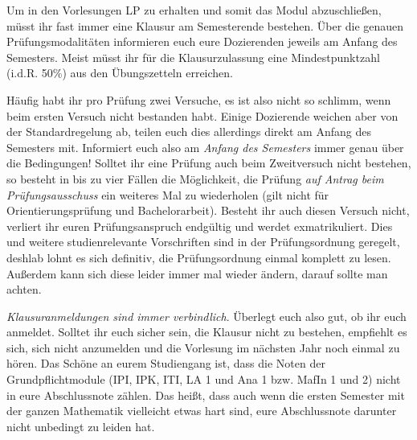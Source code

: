 Um in den Vorlesungen \gls{LP} zu erhalten und somit das Modul abzuschließen, müsst ihr fast immer eine Klausur am Semesterende bestehen. Über die genauen Prüfungsmodalitäten informieren euch eure Dozierenden jeweils am Anfang des Semesters. Meist müsst ihr für die Klausurzulassung eine Mindestpunktzahl (i.d.R. 50\%) aus den Übungszetteln erreichen.

Häufig habt ihr pro Prüfung zwei Versuche, es ist also nicht so schlimm, wenn beim ersten Versuch nicht bestanden habt. Einige Dozierende weichen aber von der Standardregelung ab, teilen euch dies allerdings direkt am Anfang des Semesters mit. Informiert euch also am \emph{Anfang des Semesters} immer genau über die Bedingungen! Solltet ihr eine Prüfung auch beim Zweitversuch nicht bestehen, so besteht in bis zu vier Fällen die Möglichkeit, die Prüfung \emph{auf Antrag beim Prüfungsausschuss} ein weiteres Mal zu wiederholen (gilt nicht für Orientierungsprüfung und Bachelorarbeit). Besteht ihr auch diesen Versuch nicht, verliert ihr euren Prüfungsanspruch endgültig und werdet exmatrikuliert. Dies und weitere studienrelevante Vorschriften sind in der Prüfungsordnung geregelt, deshlab lohnt es sich definitiv, die Prüfungsordnung einmal komplett zu lesen. Außerdem kann sich diese leider immer mal wieder ändern, darauf sollte man achten.

\emph{Klausuranmeldungen sind immer verbindlich}. Überlegt euch also gut, ob ihr euch anmeldet. Solltet ihr euch sicher sein, die Klausur nicht zu bestehen, empfiehlt es sich, sich nicht anzumelden und die Vorlesung im nächsten Jahr noch einmal zu hören. Das Schöne an eurem Studiengang ist, dass die Noten der Grundpflichtmodule (\gls{IPI}, \gls{IPK}, \gls{ITI}, \gls{LA} 1 und \gls{Ana} 1 bzw. \gls{MafIn} 1 und 2) nicht in eure Abschlussnote zählen. Das heißt, dass auch wenn die ersten Semester mit der ganzen Mathematik vielleicht etwas hart sind, eure Abschlussnote darunter nicht unbedingt zu leiden hat.

